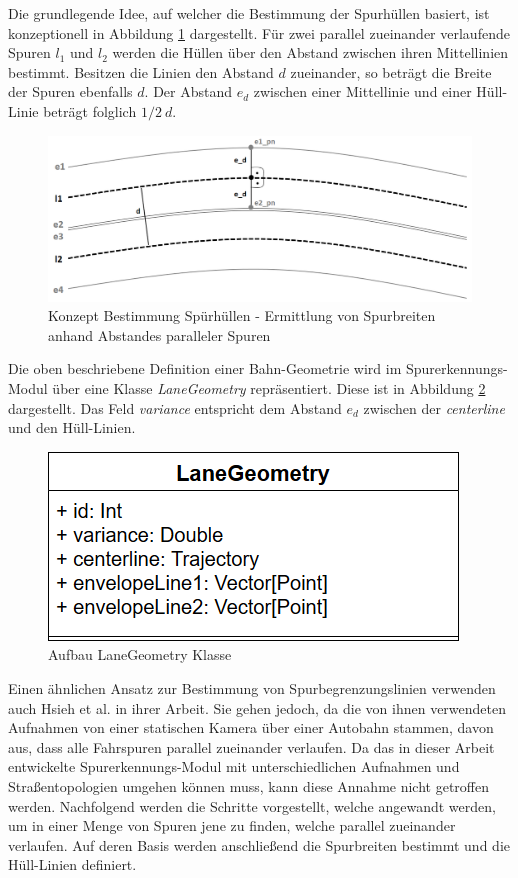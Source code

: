 Die grundlegende Idee, auf welcher die Bestimmung der Spurhüllen basiert, ist konzeptionell in Abbildung
\ref{fig:real2_envelope_definition_concept} dargestellt.
Für zwei parallel zueinander verlaufende Spuren $l_1$ und $l_2$ werden die Hüllen über den Abstand zwischen
ihren Mittellinien bestimmt. Besitzen die Linien den Abstand $d$ zueinander, so beträgt die Breite
der Spuren ebenfalls $d$. Der Abstand $e_d$ zwischen einer Mittellinie und einer Hüll-Linie beträgt folglich
$1/2\ d$.

\begin{figure}[H]
    \centering
    \includegraphics[width=0.75\linewidth]{resources/img/umsetzung/U2/concept_lane_envelope}
    \caption[Konzept Bestimmung Spürhüllen]
            {Konzept Bestimmung Spürhüllen - Ermittlung von Spurbreiten anhand Abstandes paralleler Spuren}
    \label{fig:real2_envelope_definition_concept}
\end{figure}

Die oben beschriebene Definition einer Bahn-Geometrie wird im Spurerkennungs-Modul über eine Klasse
\textit{LaneGeometry} repräsentiert. Diese ist in Abbildung \ref{fig:real2_laneGeometry_ClassDia} dargestellt.
Das Feld \textit{variance} entspricht dem Abstand $e_d$ zwischen der \textit{centerline} und den Hüll-Linien.

\begin{figure}[H]
    \centering
    \includegraphics[width=0.38\linewidth]{resources/img/umsetzung/U2/LaneGeometry_ClassDia}
    \caption{Aufbau LaneGeometry Klasse}
    \label{fig:real2_laneGeometry_ClassDia}
\end{figure}

Einen ähnlichen Ansatz zur Bestimmung von Spurbegrenzungslinien verwenden auch Hsieh et al. in ihrer Arbeit.
Sie gehen jedoch, da die von ihnen verwendeten
Aufnahmen von einer statischen Kamera über einer Autobahn stammen, davon aus, dass alle Fahrspuren parallel
zueinander verlaufen. Da das in dieser Arbeit entwickelte Spurerkennungs-Modul mit unterschiedlichen
Aufnahmen und Straßentopologien umgehen können muss, kann diese Annahme nicht getroffen werden.
Nachfolgend werden die Schritte vorgestellt, welche angewandt werden, um in einer Menge von Spuren
jene zu finden, welche parallel zueinander verlaufen. Auf deren Basis werden anschließend die Spurbreiten bestimmt und
die Hüll-Linien definiert.

